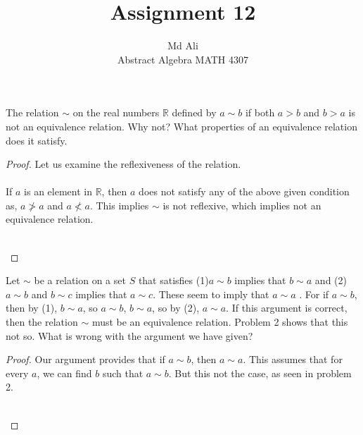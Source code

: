 \documentclass[12pt]{article}
\newenvironment{problem}[2][Problem]{\begin{trivlist}
\item[\hskip \labelsep {\bfseries #1}\hskip \labelsep {\bfseries #2.}]}{\end{trivlist}}
\begin{document}
 
 
\title{Assignment 12}%
\author{Md Ali\\ %
Abstract Algebra MATH 4307} %
 
\maketitle
 
\begin{problem}{2.4.2} %
The relation $\sim$ on the real numbers $\mathbb{R}$ defined by $a\sim b$ if both $a>b$ and $b>a$ is not an equivalence relation. Why not? What properties of an equivalence relation does it satisfy.
\end{problem}
 
\begin{proof}
Let us examine the reflexiveness of the relation. \\ \\
If $a$ is an element in $\mathbb{R}$, then $a$ does not satisfy any of the above given condition as, $a \not> a$ and $a \not< a$. This implies $\sim$ is not reflexive, which implies not an equivalence relation. \\ \\
\centerline{}
\end{proof}

\begin{problem}{2.4.3}
Let $\sim$ be a relation on a set $S$ that satisfies (1)$a\sim b$ implies that $b\sim a$ and (2)$a\sim b$ and $b\sim c$ implies that $a\sim c$. These seem to imply that $a\sim a$ . For if $a\sim b$, then by (1), $b\sim a$, so $a\sim b$, $b\sim a$, so by (2), $a\sim a$. If this argument is correct, then the relation $\sim$ must be an equivalence relation. Problem 2 shows that this not so. What is wrong with the argument we have given?
\end{problem}

\begin{proof}
Our argument provides that if $a\sim b$, then $a\sim a$. This assumes that for every $a$, we can find $b$ such that $a\sim b$. But this not the case, as seen in problem 2.  \\ \\
\centerline{}
\end{proof}
\end{document}
